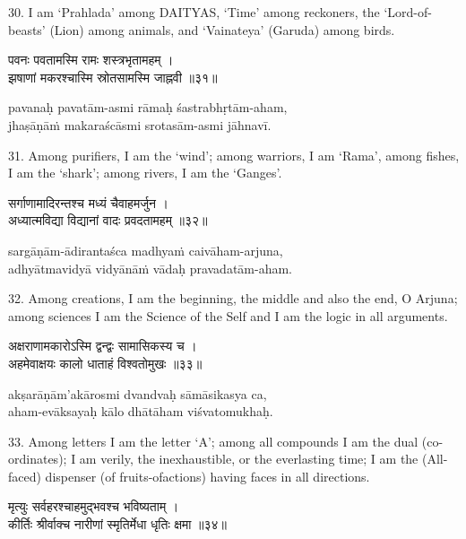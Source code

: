 30. I am `Prahlada' among DAITYAS, `Time' among reckoners, the `Lord-of-beasts'
(Lion) among animals, and `Vainateya' (Garuda) among birds.

\begin{gitaverse}
पवनः पवतामस्मि रामः शस्त्रभृतामहम् । \\
झषाणां मकरश्चास्मि स्रोतसामस्मि जाह्नवी ॥३१॥
\end{gitaverse}

\begin{transliteration}
pavanaḥ pavatām-asmi rāmaḥ śastrabhṛtām-aham, \\
jhaṣāṇāṁ makaraścāsmi srotasām-asmi jāhnavī.
\end{transliteration}

31. Among purifiers, I am the `wind'; among warriors, I am `Rama', among
fishes, I am the `shark'; among rivers, I am the `Ganges'.

\begin{gitaverse}
सर्गाणामादिरन्तश्च मध्यं चैवाहमर्जुन । \\
अध्यात्मविद्या विद्यानां वादः प्रवदतामहम् ॥३२॥
\end{gitaverse}

\begin{transliteration}
sargāṇām-ādirantaśca madhyaṁ caivāham-arjuna, \\
adhyātmavidyā vidyānāṁ vādaḥ pravadatām-aham.
\end{transliteration}

32. Among creations, I am the beginning, the middle and also the end, O Arjuna;
among sciences I am the Science of the Self and I am the logic in all
arguments.

\begin{gitaverse}
अक्षराणामकारोऽस्मि द्वन्द्वः सामासिकस्य च । \\
अहमेवाक्षयः कालो धाताहं विश्वतोमुखः ॥३३॥
\end{gitaverse}

\begin{transliteration}
akṣarāṇām'akārosmi dvandvaḥ sāmāsikasya ca, \\
aham-evāksayaḥ kālo dhātāham viśvatomukhaḥ.
\end{transliteration}

33. Among letters I am the letter `A'; among all compounds I am the dual
(co-ordinates); I am verily, the inexhaustible, or the everlasting time; I am
the (All-faced) dispenser (of fruits-ofactions) having faces in all directions.

\begin{gitaverse}
मृत्युः सर्वहरश्चाहमुद्भवश्च भविष्यताम् । \\
कीर्तिः श्रीर्वाक्च नारीणां स्मृतिर्मेधा धृतिः क्षमा ॥३४॥
\end{gitaverse}

